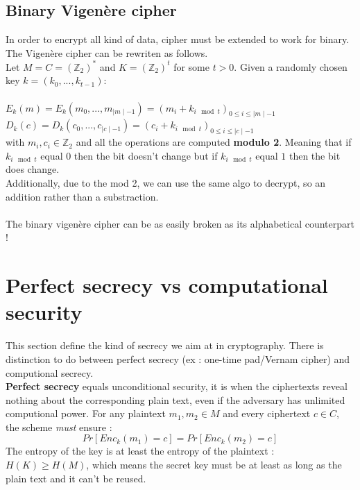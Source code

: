 \documentclass[11pt,a4paper]{report}
\begin{document}
\subsection{Binary Vigenère cipher}
In order to encrypt all kind of data, cipher must be extended to work for binary. The Vigenère cipher can be rewriten as follows.\\
Let $M = C = \left( \mathbb{Z}_2 \right)^*$ and $K = \left( \mathbb{Z}_2 \right)^t$ for some $t > 0$. Given a randomly chosen key $k = (k_0,...,k_{t-1})$:\\
\\
$E_k(m) = E_k(m_0,...,m_{\mid m \mid -1}) = (m_i + k_{i\mod t})_{0 \leq i \leq \mid m \mid -1}$\\
$D_k(c) = D_k(c_0,...,c_{\mid c \mid -1}) = (c_i + k_{i\mod t})_{0 \leq i \leq \mid c \mid -1}$\\
with $m_i,c_i \in \mathbb{Z}_{2} $ and all the operations are computed \textbf{modulo 2}. Meaning that if $k_{i\mod t}$ equal $0$ then the bit doesn't change but if $k_{i\mod t}$ equal $1$ then the bit does change.\\
Additionally, due to the mod 2, we can use the same algo to decrypt, so an addition rather than a substraction.\\
\\
The binary vigenère cipher can be as easily broken as its alphabetical counterpart !

\section{Perfect secrecy vs computational security}
This section define the kind of secrecy we aim at in cryptography. There is distinction to do between perfect secrecy (ex : one-time pad/Vernam cipher) and computional secrecy.\\

\textbf{Perfect secrecy} equals unconditional security, it is when the ciphertexts reveal nothing about the corresponding plain text, even if the adversary has unlimited computional power. For any plaintext $m_1, m_2 \in M$ and every ciphertext  $c \in C$, the scheme \emph{must} ensure :
$$Pr[Enc_k(m_1) = c] = Pr[Enc_k(m_2) = c]$$
The entropy of the key is at least the entropy of the plaintext : $H(K) \geq H(M)$, which means the secret key must be at least as long as the plain text and it can't be reused.\\
\end{document}
